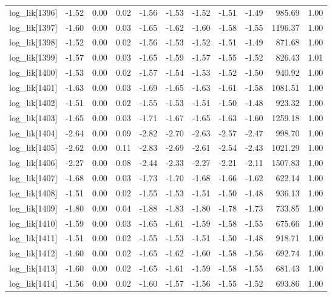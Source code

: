 \begin{table}[ht]
\begin{tabular}{rrrrrrrrrrr}
  log\_lik[1396] & -1.52 & 0.00 & 0.02 & -1.56 & -1.53 & -1.52 & -1.51 & -1.49 & 985.69 & 1.00 \\ 
  log\_lik[1397] & -1.60 & 0.00 & 0.03 & -1.65 & -1.62 & -1.60 & -1.58 & -1.55 & 1196.37 & 1.00 \\ 
  log\_lik[1398] & -1.52 & 0.00 & 0.02 & -1.56 & -1.53 & -1.52 & -1.51 & -1.49 & 871.68 & 1.00 \\ 
  log\_lik[1399] & -1.57 & 0.00 & 0.03 & -1.65 & -1.59 & -1.57 & -1.55 & -1.52 & 826.43 & 1.01 \\ 
  log\_lik[1400] & -1.53 & 0.00 & 0.02 & -1.57 & -1.54 & -1.53 & -1.52 & -1.50 & 940.92 & 1.00 \\ 
  log\_lik[1401] & -1.63 & 0.00 & 0.03 & -1.69 & -1.65 & -1.63 & -1.61 & -1.58 & 1081.51 & 1.00 \\ 
  log\_lik[1402] & -1.51 & 0.00 & 0.02 & -1.55 & -1.53 & -1.51 & -1.50 & -1.48 & 923.32 & 1.00 \\ 
  log\_lik[1403] & -1.65 & 0.00 & 0.03 & -1.71 & -1.67 & -1.65 & -1.63 & -1.60 & 1259.18 & 1.00 \\ 
  log\_lik[1404] & -2.64 & 0.00 & 0.09 & -2.82 & -2.70 & -2.63 & -2.57 & -2.47 & 998.70 & 1.00 \\ 
  log\_lik[1405] & -2.62 & 0.00 & 0.11 & -2.83 & -2.69 & -2.61 & -2.54 & -2.43 & 1021.29 & 1.00 \\ 
  log\_lik[1406] & -2.27 & 0.00 & 0.08 & -2.44 & -2.33 & -2.27 & -2.21 & -2.11 & 1507.83 & 1.00 \\ 
  log\_lik[1407] & -1.68 & 0.00 & 0.03 & -1.73 & -1.70 & -1.68 & -1.66 & -1.62 & 622.14 & 1.00 \\ 
  log\_lik[1408] & -1.51 & 0.00 & 0.02 & -1.55 & -1.53 & -1.51 & -1.50 & -1.48 & 936.13 & 1.00 \\ 
  log\_lik[1409] & -1.80 & 0.00 & 0.04 & -1.88 & -1.83 & -1.80 & -1.78 & -1.73 & 733.85 & 1.00 \\ 
  log\_lik[1410] & -1.59 & 0.00 & 0.03 & -1.65 & -1.61 & -1.59 & -1.58 & -1.55 & 675.66 & 1.00 \\ 
  log\_lik[1411] & -1.51 & 0.00 & 0.02 & -1.55 & -1.53 & -1.51 & -1.50 & -1.48 & 918.71 & 1.00 \\ 
  log\_lik[1412] & -1.60 & 0.00 & 0.02 & -1.65 & -1.62 & -1.60 & -1.58 & -1.56 & 692.74 & 1.00 \\ 
  log\_lik[1413] & -1.60 & 0.00 & 0.02 & -1.65 & -1.61 & -1.59 & -1.58 & -1.55 & 681.43 & 1.00 \\ 
  log\_lik[1414] & -1.56 & 0.00 & 0.02 & -1.60 & -1.57 & -1.56 & -1.55 & -1.52 & 693.86 & 1.00 \\ 

\end{tabular}
\end{table}
